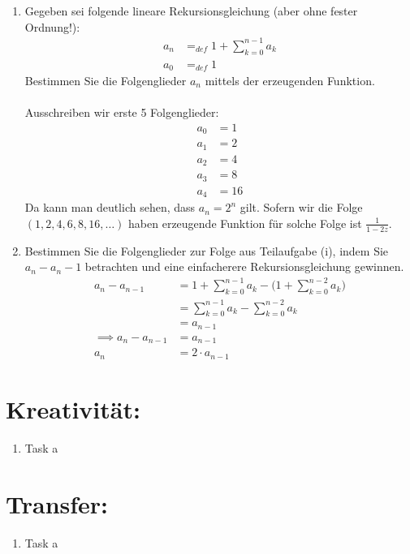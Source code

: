 \begin{enumerate}[label=(\alph*)]
        \item Gegeben sei folgende lineare Rekursionsgleichung (aber ohne fester Ordnung!):
        \begin{align*}
            a_n &=_{def} 1 + \sum_{k=0}^{n-1} a_k \\
            a_0 &=_{def} 1
        \end{align*}
        Bestimmen Sie die Folgenglieder $a_n$ mittels der erzeugenden Funktion.\\\\
        Ausschreiben wir erste 5 Folgenglieder:
        \begin{align*}
            a_0 &= 1\\
            a_1 &= 2\\
            a_2 &= 4\\
            a_3 &= 8\\
            a_4 &= 16
        \end{align*}
        Da kann man deutlich sehen, dass $a_n = 2^n$ gilt. Sofern wir die Folge $(1,2,4,6,8,16,\ldots)$
        haben erzeugende Funktion für solche Folge ist $\displaystyle\frac{1}{1-2z}$.

        \item Bestimmen Sie die Folgenglieder zur Folge aus Teilaufgabe (i), indem Sie $a_n - a_n-1$
        betrachten und eine einfacherere Rekursionsgleichung gewinnen.
        \begin{align*}
            a_n - a_{n-1} &= 1+\sum_{k=0}^{n-1} a_k - \Big(1+\sum_{k=0}^{n-2} a_k\Big) \\
            &= \sum_{k=0}^{n-1} a_k - \sum_{k=0}^{n-2} a_k \\
            &= a_{n-1} \\
            \implies a_n - a_{n-1} &= a_{n-1} \\
            a_n &= 2\cdot a_{n-1}
        \end{align*}
    \end{enumerate}
    \section*{Kreativität:}
    \begin{enumerate}[label=(\alph*)]
        \item Task a
    \end{enumerate}
    \section*{Transfer:}
    \begin{enumerate}[label=(\alph*)]
        \item Task a
    \end{enumerate}







